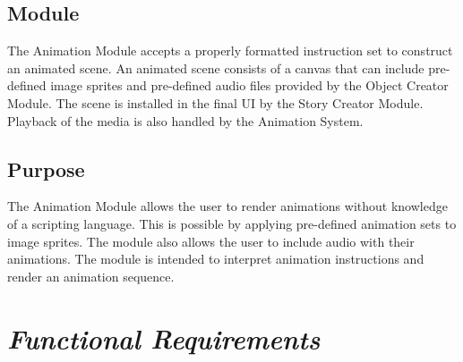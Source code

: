 \documentclass[12pt]{article}
\begin{document}
	\subsection{Module}
	The Animation Module accepts a properly formatted instruction set to construct an animated scene. An animated scene consists of a canvas that can include pre-defined image sprites and pre-defined audio files provided by the Object Creator Module. The scene is installed in the final UI by the Story Creator Module. Playback of the media is also handled by the Animation System.
	\subsection{Purpose}
        The Animation Module allows the user to render animations without knowledge of a scripting language. This is possible by applying pre-defined animation sets to image sprites. The module also allows the user to include audio with their animations. The module is intended to interpret animation instructions and render an animation sequence.

\section{\emph{Functional Requirements}}
\end{document}
